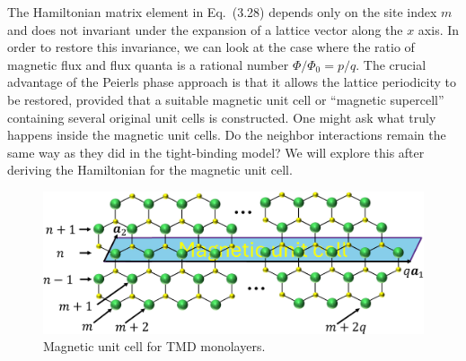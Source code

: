 The Hamiltonian matrix element in Eq.~(3.28) depends only on the site index $m$ and does not invariant under the expansion of a lattice vector along the $x$ axis. In order to restore this invariance, we can look at the case where the ratio of magnetic flux and flux quanta is a rational number $\Phi / \Phi_{0} = p / q$. The crucial advantage of the Peierls phase approach is that it allows the lattice periodicity to be restored, provided that a suitable magnetic unit cell or ``magnetic supercell'' containing several original unit cells is constructed. One might ask what truly happens inside the magnetic unit cells. Do the neighbor interactions remain the same way as they did in the tight-binding model? We will explore this after deriving the Hamiltonian for the magnetic unit cell.

\begin{figure}[H]
	\centering
	\includegraphics[width=\linewidth]{pic/magneticUC_cut.pdf}
	\caption[Magnetic unit cell for TMD monolayers.]{\label{fig:Mag UC}Magnetic unit cell for TMD monolayers.}
\end{figure}

